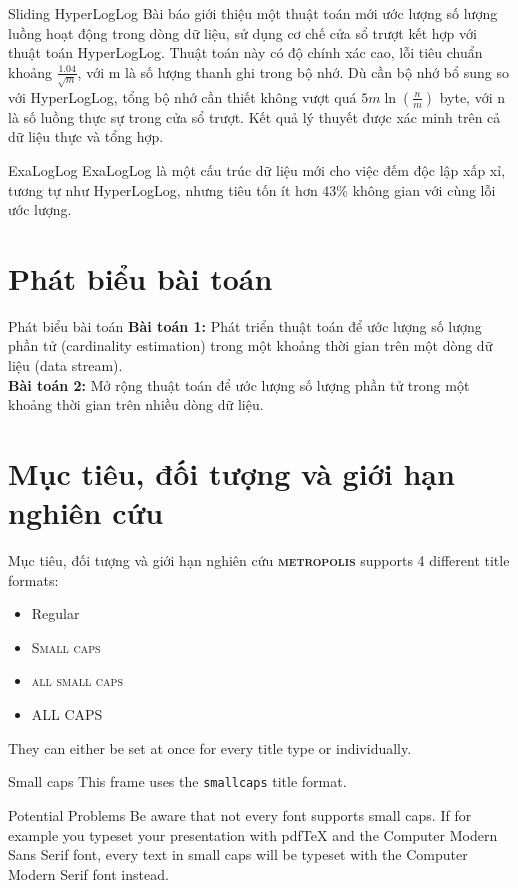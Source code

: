 \documentclass[10pt]{beamer}
\newcommand{\themename}{\textbf{\textsc{metropolis}}\xspace}
\begin{document}
\begin{frame}[fragile]{Sliding HyperLogLog \cite{chabchoub2010sliding}}
  Bài báo giới thiệu một thuật toán mới ước lượng số lượng luồng hoạt động trong dòng dữ liệu, sử dụng cơ chế cửa sổ trượt kết hợp với 
  thuật toán HyperLogLog. Thuật toán này có độ chính xác cao, lỗi tiêu chuẩn khoảng $\frac{1.04}{\sqrt{m}}$, với m là số lượng thanh ghi trong bộ nhớ. Dù cần bộ nhớ bổ sung 
  so với HyperLogLog, tổng bộ nhớ cần thiết không vượt quá $5m\ln(\frac{n}{m})$ byte, với n là số luồng thực sự trong cửa sổ trượt. Kết quả lý thuyết được xác minh trên cả dữ liệu thực 
  và tổng hợp.
\end{frame}
\begin{frame}[fragile]{ExaLogLog \cite{ertl2024exaloglog}}
  ExaLogLog là một cấu trúc dữ liệu mới cho việc đếm độc lập xấp xỉ, tương tự như HyperLogLog, nhưng tiêu tốn ít hơn 43\% không gian với cùng lỗi ước lượng.
\end{frame}
\section{Phát biểu bài toán}
\begin{frame}[fragile]{Phát biểu bài toán}
\textbf{Bài toán 1:} Phát triển thuật toán để ước lượng số lượng phần tử (cardinality estimation) trong một khoảng thời gian trên một dòng dữ liệu (data stream).\\
\textbf{Bài toán 2:} Mở rộng thuật toán để ước lượng số lượng phần tử trong một khoảng thời gian trên nhiều dòng dữ liệu.
\end{frame}
\section{Mục tiêu, đối tượng và giới hạn nghiên cứu}

\begin{frame}{Mục tiêu, đối tượng và giới hạn nghiên cứu}
	\themename supports 4 different title formats:
	\begin{itemize}
		\item Regular
		\item \textsc{Small caps}
		\item \textsc{all small caps}
		\item ALL CAPS
	\end{itemize}
	They can either be set at once for every title type or individually.
\end{frame}

{
\begin{frame}{Small caps}
	This frame uses the \texttt{smallcaps} title format.

	\begin{alertblock}{Potential Problems}
		Be aware that not every font supports small caps. If for example you typeset your presentation with pdfTeX and the Computer Modern Sans Serif font, every text in small caps will be typeset with the Computer Modern Serif font instead.
	\end{alertblock}
\end{frame}
}
\end{document}
